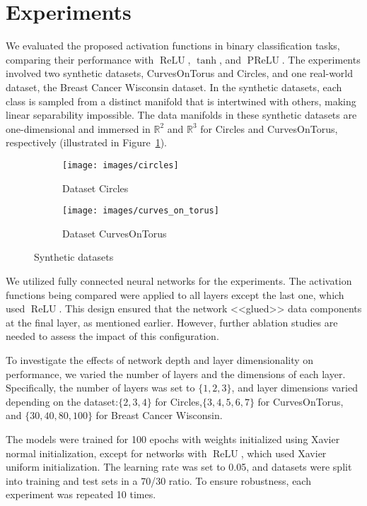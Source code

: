 \documentclass{esannV2}
\DeclareMathOperator{\relu}{\mathrm{ReLU}}
\DeclareMathOperator{\prelu}{\mathrm{PReLU}}
\begin{document}
\section{Experiments}

We evaluated the proposed activation functions in binary classification tasks, comparing their performance with \( \relu \), $\tanh$, and \( \prelu \). The experiments involved two synthetic datasets, CurvesOnTorus and Circles, and one real-world dataset, the Breast Cancer Wisconsin dataset. In the synthetic datasets, each class is sampled from a distinct manifold that is intertwined with others, making linear separability impossible. The data manifolds in these synthetic datasets are one-dimensional and immersed in $\mathbb{R}^2$ and $\mathbb{R}^3$ for Circles and CurvesOnTorus, respectively (illustrated in Figure~\ref{fig:data_manifolds}).

\begin{figure}[!htb]
  \centering
  \begin{subfigure}[b]{0.45\linewidth}
    \centering
    \texttt{[image: images/circles]}
    \caption{Dataset Circles}
  \end{subfigure}
  \begin{subfigure}[b]{0.45\linewidth}
    \centering
    \texttt{[image: images/curves\_on\_torus]}
    \caption{Dataset CurvesOnTorus}
  \end{subfigure}
  \caption{Synthetic datasets}
  \label{fig:data_manifolds}
\end{figure}

We utilized fully connected neural networks for the experiments. The activation functions being compared were applied to all layers except the last one, which used \( \relu \). This design ensured that the network <<glued>> data components at the final layer, as mentioned earlier. However, further ablation studies are needed to assess the impact of this configuration.

To investigate the effects of network depth and layer dimensionality on performance, we varied the number of layers and the dimensions of each layer. Specifically, the number of layers was set to $\{1, 2, 3\}$, and layer dimensions varied depending on the dataset:$\{2, 3, 4\}$ for Circles,$\{3, 4, 5, 6, 7\}$ for CurvesOnTorus, and $\{30, 40, 80, 100\}$ for Breast Cancer Wisconsin.

The models were trained for 100 epochs with weights initialized using Xavier normal initialization, except for networks with \( \relu \), which used Xavier uniform initialization. The learning rate was set to 0.05, and datasets were split into training and test sets in a 70/30 ratio. To ensure robustness, each experiment was repeated 10 times.
\end{document}
